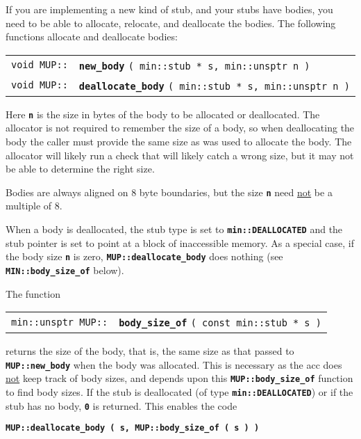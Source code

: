 \documentclass[12pt]{article}
\makeatletter
\newcommand{\TT}[1]{{\tt \bfseries #1}}
\newcommand{\ttindex}[1]{\index{#1@{\tt #1}}}
\newcommand{\EOL}{\penalty \exhyphenpenalty}
\newenvironment{indpar}[1][0.3in]%
	{\begin{list}{}%
		     {\setlength{\itemsep}{0in}%
		      \setlength{\topsep}{0in}%
		      \setlength{\parsep}{1ex}%
		      \setlength{\labelwidth}{#1}%
		      \setlength{\leftmargin}{#1}%
		      \addtolength{\leftmargin}{\labelsep}}%
	 \item}%
	{\end{list}}
\newcommand{\LABEL}[1]{\label{#1}}
\newcommand{\MUPKEY}[1]%
	   {\TT{#1}\ttindex{MUP::#1}\ttindex{#1}}
\makeatother
\begin{document}
If you are implementing a new kind of stub, and your stubs have bodies,
you need to be able to allocate, relocate, and deallocate the bodies.
The following functions allocate and deallocate bodies:

\begin{indpar}\begin{tabular}{@{}r@{}l@{}}
\verb|void MUP::|
    & \MUPKEY{new\_body} \verb|( min::stub * s, min::unsptr n )|
\LABEL{MUP::NEW_BODY} \\
\verb|void MUP::|
    & \MUPKEY{deallocate\_body} \verb|( min::stub * s, min::unsptr n )|
\LABEL{MUP::DEALLOCATE_BODY} \\
\end{tabular}\end{indpar}

Here \TT{n} is the size in bytes of the body to be allocated or deallocated.
The allocator is not required to remember the size of a body,
so when deallocating the body the caller must provide the same size
as was used to allocate the body.  The allocator will likely
run a check that will likely catch a wrong size, but it may not
be able to determine the right size.

Bodies are always aligned on 8 byte boundaries, but the size \TT{n}
need \underline{not} be a multiple of 8.

When a body is deallocated, the stub type is set to
\TT{min::DEALLOCATED} and the stub pointer is set to
point at a block of inaccessible memory.
As a special case, if the body size \TT{n} is zero,
\TT{MUP::\EOL deallocate\_\EOL body} does nothing
(see \TT{MIN::\EOL body\_\EOL size\_\EOL of} below).


The function

\begin{indpar}\begin{tabular}{@{}r@{}l@{}}
\verb|min::unsptr MUP::|
    & \MUPKEY{body\_size\_of} \verb|( const min::stub * s )|
\LABEL{MUP::BODY_SIZE_OF} \\
\end{tabular}\end{indpar}

returns the size of the body, that is, the same size
as that passed to \TT{MUP::new\_\EOL body} when the
body was allocated.  This is necessary as the acc does
\underline{not} keep track of body sizes, and depends upon
this \TT{MUP::body\_\EOL size\_\EOL of} function to
find body sizes.  If the stub is deallocated (of type
\TT{min::DEALLOCATED}) or if the stub has no body,
\TT{0} is returned.  This enables the code
\begin{center}
\TT{MUP::deallocate\_body ( s, MUP::body\_size\_of ( s ) )}
\end{center}
\end{document}
